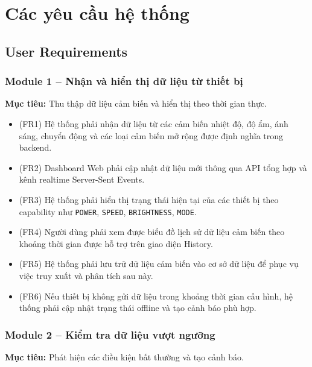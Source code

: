 \section{Các yêu cầu hệ thống}

\subsection{User Requirements}

\subsubsection{Module 1 – Nhận và hiển thị dữ liệu từ thiết bị}

\textbf{Mục tiêu:} Thu thập dữ liệu cảm biến và hiển thị theo thời gian thực.

\begin{itemize}
    \item (FR1) Hệ thống phải nhận dữ liệu từ các cảm biến nhiệt độ, độ ẩm, ánh sáng, chuyển động và các loại cảm biến mở rộng được định nghĩa trong backend.
    
    \item (FR2) Dashboard Web phải cập nhật dữ liệu mới thông qua API tổng hợp và kênh realtime Server-Sent Events.
    
    \item (FR3) Hệ thống phải hiển thị trạng thái hiện tại của các thiết bị theo capability như \texttt{POWER}, \texttt{SPEED}, \texttt{BRIGHTNESS}, \texttt{MODE}.
    
    \item (FR4) Người dùng phải xem được biểu đồ lịch sử dữ liệu cảm biến theo khoảng thời gian được hỗ trợ trên giao diện History.
    
    \item (FR5) Hệ thống phải lưu trữ dữ liệu cảm biến vào cơ sở dữ liệu để phục vụ việc truy xuất và phân tích sau này.
    
    \item (FR6) Nếu thiết bị không gửi dữ liệu trong khoảng thời gian cấu hình, hệ thống phải cập nhật trạng thái offline và tạo cảnh báo phù hợp.
\end{itemize}

\subsubsection{Module 2 – Kiểm tra dữ liệu vượt ngưỡng}

\textbf{Mục tiêu:} Phát hiện các điều kiện bất thường và tạo cảnh báo.

